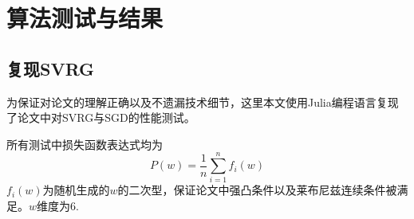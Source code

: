 
\chapter{算法测试与结果}

\section{复现SVRG}

为保证对论文的理解正确以及不遗漏技术细节，这里本文使用Julia编程语言复现了论文中对SVRG与SGD的性能测试。

所有测试中损失函数表达式均为
\begin{equation}\label{key}
P(w) = \frac1n \sum_{i=1}^n f_i(w)
\end{equation}
$f_i(w)$为随机生成的$w$的二次型，保证论文中强凸条件以及莱布尼兹连续条件被满足。$w$维度为6.

